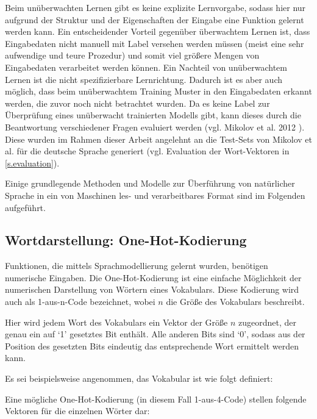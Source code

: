 Beim unüberwachten Lernen gibt es keine explizite Lernvorgabe, sodass hier nur aufgrund der Struktur und der Eigenschaften der Eingabe eine Funktion gelernt werden kann. Ein entscheidender Vorteil gegenüber überwachtem Lernen ist, dass Eingabedaten nicht manuell mit Label versehen werden müssen (meist eine sehr aufwendige und teure Prozedur) und somit viel größere Mengen von Eingabedaten verarbeitet werden können. Ein Nachteil von unüberwachtem Lernen ist die nicht spezifizierbare Lernrichtung. Dadurch ist es aber auch möglich, dass beim unüberwachtem Training Muster in den Eingabedaten erkannt werden, die zuvor noch nicht betrachtet wurden. Da es keine Label zur Überprüfung eines unüberwacht trainierten Modells gibt, kann dieses durch die Beantwortung verschiedener Fragen evaluiert werden (vgl. Mikolov et al. 2012 \citep{Mikolov2012}). Diese wurden im Rahmen dieser Arbeit angelehnt an die Test-Sets von Mikolov et al. für die deutsche Sprache generiert (vgl. Evaluation der Wort-Vektoren in \autoref{s.evaluation}).

Einige grundlegende Methoden und Modelle zur Überführung von natürlicher Sprache in ein von Maschinen les- und verarbeitbares Format sind im Folgenden aufgeführt.

\subsection{Wortdarstellung: One-Hot-Kodierung}\label{ss.onehot}
Funktionen, die mittels Sprachmodellierung gelernt wurden, benötigen numerische Eingaben. Die One-Hot-Kodierung ist eine einfache Möglichkeit der numerischen Darstellung von Wörtern eines Vokabulars. Diese Kodierung wird auch als 1-aus-n-Code bezeichnet, wobei $n$ die Größe des Vokabulars beschreibt.

Hier wird jedem Wort des Vokabulars ein Vektor der Größe $n$ zugeordnet, der genau ein auf `1' gesetztes Bit enthält. Alle anderen Bits sind `0', sodass aus der Position des gesetzten Bits eindeutig das entsprechende Wort ermittelt werden kann.

Es sei beispielsweise angenommen, das Vokabular ist wie folgt definiert:\\

Eine mögliche One-Hot-Kodierung (in diesem Fall 1-aus-4-Code) stellen folgende Vektoren für die einzelnen Wörter dar:


